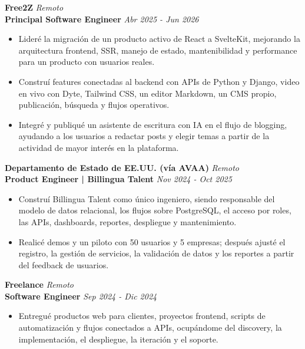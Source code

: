 \documentclass[10pt]{article}
\begin{document}
\vspace{2pt}
\textbf{Free2Z} \hfill \textit{Remoto} \\
\textbf{Principal Software Engineer} \hfill \textit{Abr 2025 - Jun 2026}
\begin{itemize}
    \item Lideré la migración de un producto activo de React a SvelteKit, mejorando la arquitectura frontend, SSR, manejo de estado, mantenibilidad y performance para un producto con usuarios reales.
    \item Construí features conectadas al backend con APIs de Python y Django, video en vivo con Dyte, Tailwind CSS, un editor Markdown, un CMS propio, publicación, búsqueda y flujos operativos.
    \item Integré y publiqué un asistente de escritura con IA en el flujo de blogging, ayudando a los usuarios a redactar posts y elegir temas a partir de la actividad de mayor interés en la plataforma.
\end{itemize}

\vspace{2pt}
\textbf{Departamento de Estado de EE.UU. (vía AVAA)} \hfill \textit{Remoto} \\
\textbf{Product Engineer | Billingua Talent} \hfill \textit{Nov 2024 - Oct 2025}
\begin{itemize}
    \item Construí Billingua Talent como único ingeniero, siendo responsable del modelo de datos relacional, los flujos sobre PostgreSQL, el acceso por roles, las APIs, dashboards, reportes, despliegue y mantenimiento.
    \item Realicé demos y un piloto con 50 usuarios y 5 empresas; después ajusté el registro, la gestión de servicios, la validación de datos y los reportes a partir del feedback de usuarios.
\end{itemize}

\vspace{2pt}
\textbf{Freelance} \hfill \textit{Remoto} \\
\textbf{Software Engineer} \hfill \textit{Sep 2024 - Dic 2024}
\begin{itemize}
    \item Entregué productos web para clientes, proyectos frontend, scripts de automatización y flujos conectados a APIs, ocupándome del discovery, la implementación, el despliegue, la iteración y el soporte.
\end{itemize}
\end{document}
